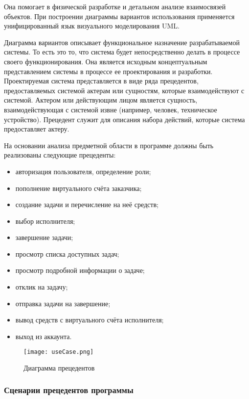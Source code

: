 Она помогает в физической разработке и детальном анализе взаимосвязей объектов. При построении диаграммы вариантов использования применяется унифицированный язык визуального моделирования UML.

Диаграмма вариантов описывает функциональное назначение разрабатываемой системы. То есть это то, что система будет непосредственно делать в процессе своего функционирования. Она является исходным концептуальным представлением системы в процессе ее проектирования и разработки. Проектируемая система представляется в виде ряда прецедентов, предоставляемых системой актерам или сущностям, которые взаимодействуют с системой. Актером или действующим лицом является сущность, взаимодействующая с системой извне (например, человек, техническое устройство). Прецедент служит для описания набора действий, которые система предоставляет актеру.

На основании анализа предметной области в программе должны быть реализованы следующие прецеденты:
\begin{itemize}
\item авторизация пользователя, определение роли;
\item пополнение виртуального счёта заказчика;
\item создание задачи и перечисление на неё средств;
\item выбор исполнителя;
\item завершение задачи;
\item просмотр списка доступных задач;
\item просмотр подробной информации о задаче;
\item отклик на задачу;
\item отправка задачи на завершение;
\item вывод средств с виртуального счёта исполнителя;
\item выход из аккаунта.
\end{itemize}
\clearpage

\begin{figure}[ht]
	\texttt{[image: useCase.png]}
	\caption{Диаграмма прецедентов}
	\label{ucUML:image}
\end{figure}

\subsubsection{Сценарии прецедентов программы}

